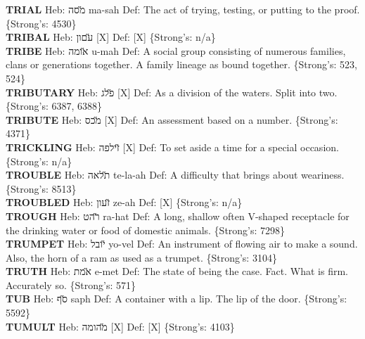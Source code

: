 {\textbf{TRIAL} Heb: {\large\H מסה} ma-sah Def: The act of trying, testing, or putting to the proof. \{Strong's: 4530\}\hfill{}\\

\textbf{TRIBAL} Heb: {\large\H עםון} {[}X{]} Def: {[}X{]} \{Strong's: n/a\}\hfill{}\\

\textbf{TRIBE} Heb: {\large\H אומה} u-mah Def: A social group consisting of numerous families, clans or generations together. A family lineage as bound together. \{Strong's: 523, 524\}\hfill{}\\

\textbf{TRIBUTARY} Heb: {\large\H פלג} {[}X{]} Def: As a division of the waters. Split into two. \{Strong's: 6387, 6388\}\hfill{}\\

\textbf{TRIBUTE} Heb: {\large\H מכס} {[}X{]} Def: An assessment based on a number. \{Strong's: 4371\}\hfill{}\\

\textbf{TRICKLING} Heb: {\large\H זילפה} {[}X{]} Def: To set aside a time for a special occasion. \{Strong's: n/a\}\hfill{}\\

\textbf{TROUBLE} Heb: {\large\H תלאה} te-la-ah Def: A difficulty that brings about weariness. \{Strong's: 8513\}\hfill{}\\

\textbf{TROUBLED} Heb: {\large\H זעון} ze-ah Def: {[}X{]} \{Strong's: n/a\}\hfill{}\\

\textbf{TROUGH} Heb: {\large\H רהט} ra-hat Def: A long, shallow often V-shaped receptacle for the drinking water or food of domestic animals. \{Strong's: 7298\}\hfill{}\\

\textbf{TRUMPET} Heb: {\large\H יובל} yo-vel Def: An instrument of flowing air to make a sound. Also, the horn of a ram as used as a trumpet. \{Strong's: 3104\}\hfill{}\\

\textbf{TRUTH} Heb: {\large\H אמת} e-met Def: The state of being the case. Fact. What is firm. Accurately so. \{Strong's: 571\}\hfill{}\\

\textbf{TUB} Heb: {\large\H סף} saph Def: A container with a lip. The lip of the door. \{Strong's: 5592\}\hfill{}\\

\textbf{TUMULT} Heb: {\large\H מהומה} {[}X{]} Def: {[}X{]} \{Strong's: 4103\}\hfill{}\\

}
